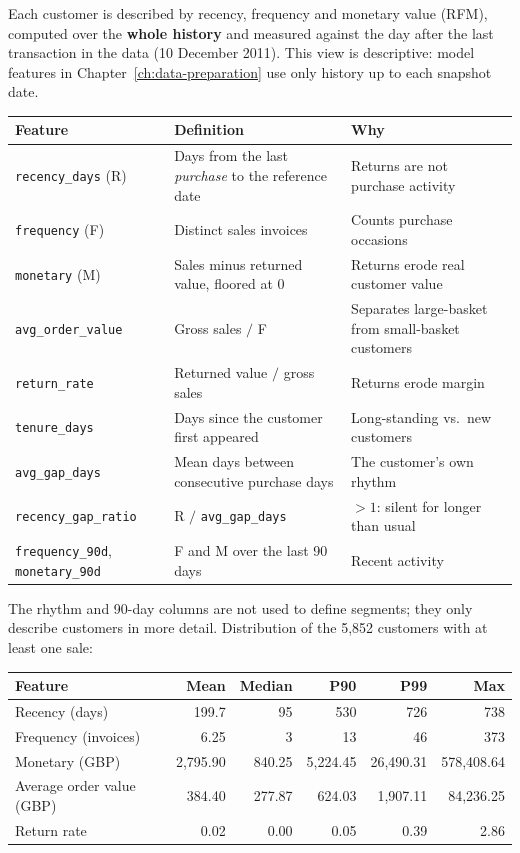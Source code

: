 Each customer is described by recency, frequency and monetary value (RFM), computed over the \textbf{whole history} and measured against the day after the last transaction in the data (10 December 2011). This view is descriptive: model features in Chapter~\ref{ch:data-preparation} use only history up to each snapshot date.

\begin{center}
\small
\begin{tabular}{@{}p{3.4cm}p{6.2cm}p{4.9cm}@{}}
    \toprule
    Feature & Definition & Why \\
    \midrule
    \texttt{recency\_days} (R) & Days from the last \emph{purchase} to the reference date & Returns are not purchase activity \\
    \texttt{frequency} (F) & Distinct sales invoices & Counts purchase occasions \\
    \texttt{monetary} (M) & Sales minus returned value, floored at 0 & Returns erode real customer value \\
    \texttt{avg\_order\_value} & Gross sales $/$ F & Separates large-basket from small-basket customers \\
    \texttt{return\_rate} & Returned value $/$ gross sales & Returns erode margin \\
    \texttt{tenure\_days} & Days since the customer first appeared & Long-standing vs.\ new customers \\
    \texttt{avg\_gap\_days} & Mean days between consecutive purchase days & The customer's own rhythm \\
    \texttt{recency\_gap\_ratio} & R $/$ \texttt{avg\_gap\_days} & $>1$: silent for longer than usual \\
    \texttt{frequency\_90d}, \texttt{monetary\_90d} & F and M over the last 90 days & Recent activity \\
    \bottomrule
\end{tabular}
\end{center}

The rhythm and 90-day columns are not used to define segments; they only describe customers in more detail. Distribution of the 5,852 customers with at least one sale:

\begin{center}
\small
\begin{tabular}{@{}lrrrrr@{}}
    \toprule
    Feature & Mean & Median & P90 & P99 & Max \\
    \midrule
    Recency (days) & 199.7 & 95 & 530 & 726 & 738 \\
    Frequency (invoices) & 6.25 & 3 & 13 & 46 & 373 \\
    Monetary (GBP) & 2,795.90 & 840.25 & 5,224.45 & 26,490.31 & 578,408.64 \\
    Average order value (GBP) & 384.40 & 277.87 & 624.03 & 1,907.11 & 84,236.25 \\
    Return rate & 0.02 & 0.00 & 0.05 & 0.39 & 2.86 \\
    \bottomrule
\end{tabular}
\end{center}

